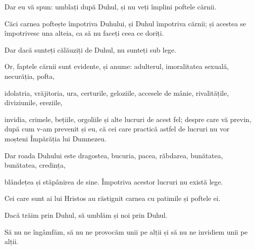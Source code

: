 {\par }{\PP {}Dar eu vă spun: umblați după Duhul, și nu veți împlini poftele cărnii.

Căci carnea poftește împotriva Duhului, și Duhul împotriva cărnii; și acestea se împotrivesc una alteia, ca să nu faceți ceea ce doriți.

Dar dacă sunteți călăuziți de Duhul, nu sunteți sub lege.

Or, faptele cărnii sunt evidente, și anume: adulterul, imoralitatea sexuală, necurăția, pofta,

idolatria, vrăjitoria, ura, certurile, geloziile, accesele de mânie, rivalitățile, diviziunile, ereziile,

invidia, crimele, bețiile, orgoliile și alte lucruri de acest fel; despre care vă previn, după cum v-am prevenit și eu, că cei care practică astfel de lucruri nu vor moșteni Împărăția lui Dumnezeu.


\par }{\PP {}Dar roada Duhului este dragostea, bucuria, pacea, răbdarea, bunătatea, bunătatea, credința,

blândețea și stăpânirea de sine. Împotriva acestor lucruri nu există lege.

Cei care sunt ai lui Hristos au răstignit carnea cu patimile și poftele ei.


\par }{\PP {}Dacă trăim prin Duhul, să umblăm și noi prin Duhul.

Să nu ne îngâmfăm, să nu ne provocăm unii pe alții și să nu ne invidiem unii pe alții.



\par }
